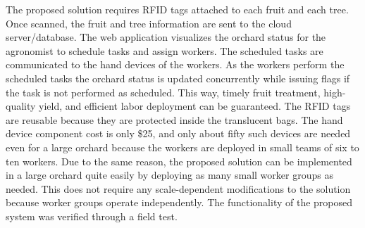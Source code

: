 \documentclass[journal]{IEEEtran}
\begin{document}
The proposed solution requires RFID tags attached to each fruit and each tree. Once scanned, the fruit and tree information are sent to the cloud server/database. The web application visualizes the orchard status for the agronomist to schedule tasks and assign workers. The scheduled tasks are communicated to the hand devices of the workers. As the workers perform the scheduled tasks the orchard status is updated concurrently while issuing flags if the task is not performed as scheduled. This way, timely fruit treatment, high-quality yield, and efficient labor deployment can be guaranteed. The RFID tags are reusable because they are protected inside the translucent bags. The hand device component cost is only \$25, and only about fifty such devices are needed even for a large orchard because the workers are deployed in small teams of six to ten workers. Due to the same reason, the proposed solution can be implemented in a large orchard quite easily by deploying as many small worker groups as needed. This does not require any scale-dependent modifications to the solution because worker groups operate independently. The functionality of the proposed system was verified through a field test.
\end{document}
